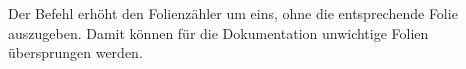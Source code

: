 \begin{nutzung}
		\>
\end{nutzung}

\DescribeMacro{\nextslidesilent}
Der Befehl  erhöht den Folienzähler um eins, ohne die entsprechende Folie auszugeben.
Damit können \zB für die Dokumentation unwichtige Folien übersprungen werden.

\begin{nutzung}
		\>
\end{nutzung}


